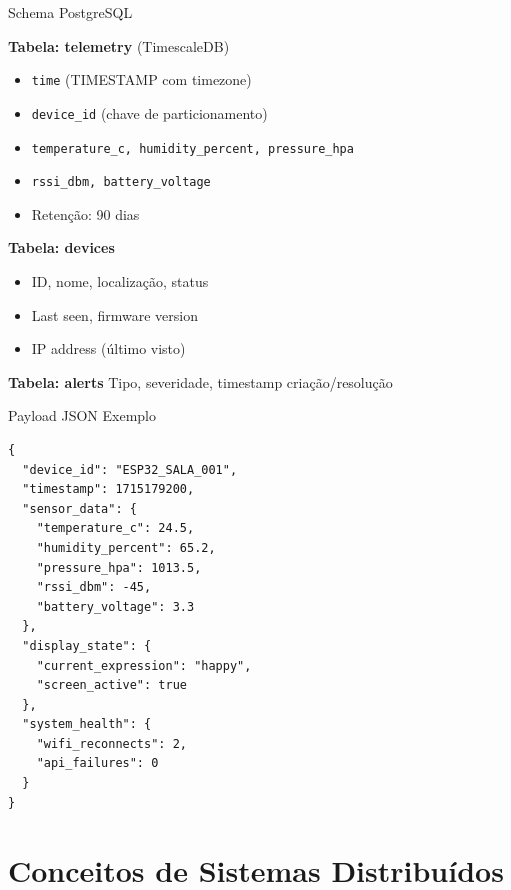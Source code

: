 \documentclass[12pt,aspectratio=16:9]{beamer}
\begin{document}
\begin{frame}{Schema PostgreSQL}
    \begin{block}{\textbf{Tabela: telemetry} (TimescaleDB)}
        \begin{itemize}
            \item \texttt{time} (TIMESTAMP com timezone)
            \item \texttt{device\_id} (chave de particionamento)
            \item \texttt{temperature\_c, humidity\_percent, pressure\_hpa}
            \item \texttt{rssi\_dbm, battery\_voltage}
            \item Retenção: 90 dias
        \end{itemize}
    \end{block}
    
    \begin{block}{\textbf{Tabela: devices}}
        \begin{itemize}
            \item ID, nome, localização, status
            \item Last seen, firmware version
            \item IP address (último visto)
        \end{itemize}
    \end{block}
    
    \begin{block}{\textbf{Tabela: alerts}}
        Tipo, severidade, timestamp criação/resolução
    \end{block}
\end{frame}

\begin{frame}{Payload JSON Exemplo}
    \lstset{language=JSON, basicstyle=\ttfamily\tiny}
    \begin{lstlisting}
{
  "device_id": "ESP32_SALA_001",
  "timestamp": 1715179200,
  "sensor_data": {
    "temperature_c": 24.5,
    "humidity_percent": 65.2,
    "pressure_hpa": 1013.5,
    "rssi_dbm": -45,
    "battery_voltage": 3.3
  },
  "display_state": {
    "current_expression": "happy",
    "screen_active": true
  },
  "system_health": {
    "wifi_reconnects": 2,
    "api_failures": 0
  }
}
    \end{lstlisting}
\end{frame}

\section{Conceitos de Sistemas Distribuídos}
\end{document}
